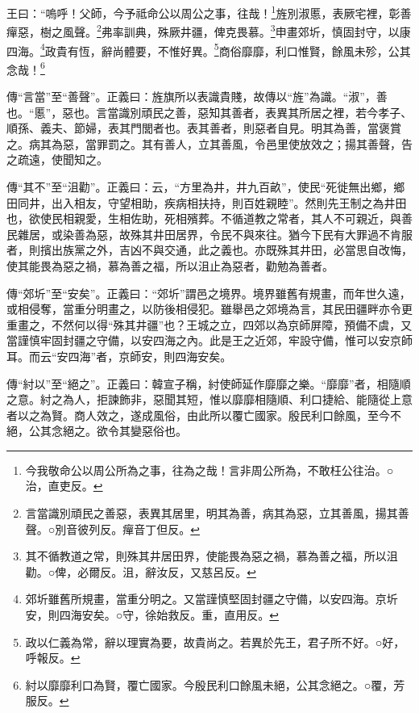 王曰：“嗚呼！父師，今予祗命公以周公之事，往哉！\footnote{今我敬命公以周公所為之事，往為之哉！言非周公所為，不敢枉公往治。○治，直吏反。}旌別淑慝，表厥宅裡，彰善癉惡，樹之風聲。\footnote{言當識別頑民之善惡，表異其居里，明其為善，病其為惡，立其善風，揚其善聲。○別音彼列反。癉音丁但反。}弗率訓典，殊厥井疆，俾克畏慕。\footnote{其不循教道之常，則殊其井居田界，使能畏為惡之禍，慕為善之福，所以沮勸。○俾，必爾反。沮，辭汝反，又慈呂反。}申畫郊圻，慎固封守，以康四海。\footnote{郊圻雖舊所規畫，當重分明之。又當謹慎堅固封疆之守備，以安四海。京圻安，則四海安矣。○守，徐始救反。重，直用反。}政貴有恆，辭尚體要，不惟好異。\footnote{政以仁義為常，辭以理實為要，故貴尚之。若異於先王，君子所不好。○好，呼報反。}商俗靡靡，利口惟賢，餘風未殄，公其念哉！\footnote{紂以靡靡利口為賢，覆亡國家。今殷民利口餘風未絕，公其念絕之。○覆，芳服反。}


{\noindent\zhuan{}\fzbyks 傳“言當”至“善聲”。正義曰：旌旗所以表識貴賤，故傳以“旌”為識。“淑”，善也。“慝”，惡也。言當識別頑民之善，惡知其善者，表異其所居之裡，若今孝子、順孫、義夫、節婦，表其門閭者也。表其善者，則惡者自見。明其為善，當褒賞之。病其為惡，當罪罰之。其有善人，立其善風，令邑里使放效之；揚其善聲，告之疏遠，使聞知之。 \par}

{\noindent\zhuan{}\fzbyks 傳“其不”至“沮勸”。正義曰：云，“方里為井，井九百畝”，使民“死徙無出鄉，鄉田同井，出入相友，守望相助，疾病相扶持，則百姓親睦”。然則先王制之為井田也，欲使民相親愛，生相佐助，死相殯葬。不循道教之常者，其人不可親近，與善民雜居，或染善為惡，故殊其井田居界，令民不與來往。猶今下民有大罪過不肯服者，則擯出族黨之外，吉凶不與交通，此之義也。亦既殊其井田，必當思自改悔，使其能畏為惡之禍，慕為善之福，所以沮止為惡者，勸勉為善者。 \par}

{\noindent\zhuan{}\fzbyks 傳“郊圻”至“安矣”。正義曰：“郊圻”謂邑之境界。境界雖舊有規畫，而年世久遠，或相侵奪，當重分明畫之，以防後相侵犯。雖舉邑之郊境為言，其民田疆畔亦令更重畫之，不然何以得“殊其井疆”也？王城之立，四郊以為京師屏障，預備不虞，又當謹慎牢固封疆之守備，以安四海之內。此是王之近郊，牢設守備，惟可以安京師耳。而云“安四海”者，京師安，則四海安矣。 \par}

{\noindent\zhuan{}\fzbyks 傳“紂以”至“絕之”。正義曰：韓宣子稱，紂使師延作靡靡之樂。“靡靡”者，相隨順之意。紂之為人，拒諫飾非，惡聞其短，惟以靡靡相隨順、利口捷給、能隨從上意者以之為賢。商人效之，遂成風俗，由此所以覆亡國家。殷民利口餘風，至今不絕，公其念絕之。欲令其變惡俗也。 \par}

